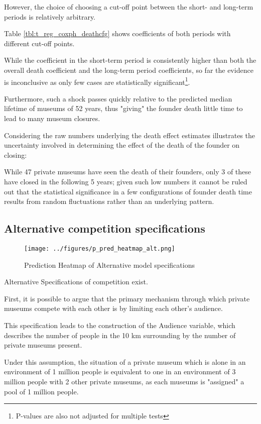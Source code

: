 \documentclass[12pt]{article}
\begin{document}
However, the choice of choosing a cut-off point between the short- and long-term periods is relatively arbitrary.


Table \ref{tbl:t_reg_coxph_deathcfg} shows coefficients of both periods with different cut-off points.

While the coefficient in the short-term period is consistently higher than both the overall death coefficient and the long-term period coefficients, so far the evidence is inconclusive as only few cases are statistically significant\footnote{P-values are also not adjusted for multiple tests}.

Furthermore, such a shock passes quickly relative to the predicted median lifetime of museums of 52 years, thus "giving" the founder death little time to lead to many museum closures. 

Considering the raw numbers underlying the death effect estimates illustrates the uncertainty involved in determining the effect of the death of the founder on closing: 

While 47 private museums have seen the death of their founders, only 3 of these have closed in the following 5 years; given such low numbers it cannot be ruled out that the statistical significance in a few configurations of founder death time results from random fluctuations rather than an underlying pattern.
\subsection*{Alternative competition specifications}



\begin{figure}[htbp]
\centering
\texttt{[image: ../figures/p\_pred\_heatmap\_alt.png]}
\caption{\label{fig:p_pred_heatmap_alt}Prediction Heatmap of Alternative model specifications}
\end{figure}


Alternative Specifications of competition exist.

First, it is possible to argue that the primary mechanism through which private museums compete with each other is by limiting each other's audience.

This specification leads to the construction of the Audience variable, which describes the number of people in the 10 km surrounding by the number of private museums present.

Under this assumption, the situation of a private museum which is alone in an environment of 1 million people is equivalent to one in an environment of 3 million people with 2 other private museums, as each museums is "assigned" a pool of 1 million people.
\end{document}
